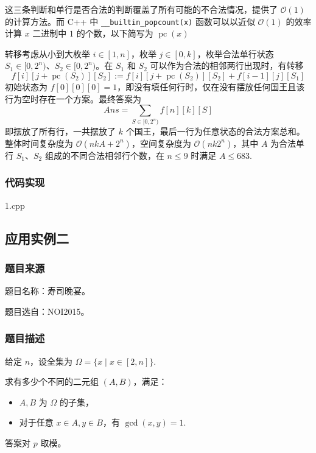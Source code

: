 这三条判断和单行是否合法的判断覆盖了所有可能的不合法情况，提供了
\(\mathcal{O}(1)\) 的计算方法。而 C++ 中
\texttt{\_\_builtin\_popcount(x)} 函数可以以近似 \(\mathcal{O}(1)\)
的效率计算 \(x\) 二进制中 \(1\) 的个数，以下简写为
\(\operatorname{pc}(x)\)

转移考虑从小到大枚举 \(i\in[1,n]\)，枚举 \(j\in[0,k]\)，枚举合法单行状态
\(S_1\in[0,2^n)\)、\(S_2\in[0,2^n)\)。在 \(S_1\) 和 \(S_2\)
可以作为合法的相邻两行出现时，有转移 \[
f[i][j+\operatorname{pc}(S_2)][S_2]:=f[i][j+\operatorname{pc}(S_2)][S_2]+f[i-1][j][S_1]
\] 初始状态为
\(f[0][0][0]=1\)，即没有填任何行时，仅在没有摆放任何国王且该行为空时存在一个方案。最终答案为
\[
Ans=\sum_{S\in[0,2^n)}f[n][k][S]
\] 即摆放了所有行，一共摆放了 \(k\)
个国王，最后一行为任意状态的合法方案总和。整体时间复杂度为
\(\mathcal{O}(nkA+2^n)\)，空间复杂度为 \(\mathcal{O}(nk2^n)\)，其中
\(A\) 为合法单行 \(S_1\)、\(S_2\) 组成的不同合法相邻行个数，在
\(n\le 9\) 时满足 \(A\le 683\).

\subsubsection{代码实现}

1.cpp

\subsection{应用实例二}

\subsubsection{题目来源}

题目名称：寿司晚宴。

题目选自：NOI2015。

\subsubsection{题目描述}

给定 \(n\)，设全集为 \(\Omega=\{x\mid x\in[2,n]\}\).

求有多少个不同的二元组 \((A,B)\)，满足：

\begin{itemize}
\tightlist
\item
  \(A,B\) 为 \(\Omega\) 的子集，
\item
  对于任意 \(x\in A,y\in B\)，有 \(\gcd(x,y)=1\).
\end{itemize}

答案对 \(p\) 取模。

